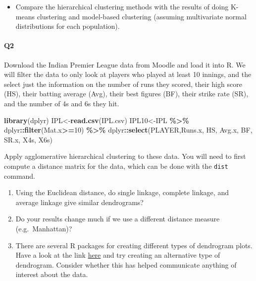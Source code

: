 \documentclass[
]{book}
\newenvironment{Shaded}{\begin{snugshade}}{\end{snugshade}}
\newcommand{\DecValTok}[1]{\textcolor[rgb]{0.00,0.00,0.81}{#1}}
\newcommand{\FunctionTok}[1]{\textcolor[rgb]{0.13,0.29,0.53}{\textbf{#1}}}
\newcommand{\NormalTok}[1]{#1}
\newcommand{\OtherTok}[1]{\textcolor[rgb]{0.56,0.35,0.01}{#1}}
\newcommand{\SpecialCharTok}[1]{\textcolor[rgb]{0.81,0.36,0.00}{\textbf{#1}}}
\newcommand{\StringTok}[1]{\textcolor[rgb]{0.31,0.60,0.02}{#1}}
\providecommand{\tightlist}{%
  \setlength{\itemsep}{0pt}\setlength{\parskip}{0pt}}
\theoremstyle{definition}
\theoremstyle{definition}
\theoremstyle{definition}
\theoremstyle{definition}
\theoremstyle{remark}
\begin{document}
\begin{itemize}
\tightlist
\item
  Compare the hierarchical clustering methods with the results of doing K-means clustering and model-based clustering (assuming multivariate normal distributions for each population).
\end{itemize}

\hypertarget{q2}{%
\paragraph*{Q2}\label{q2}}

Download the Indian Premier League data from Moodle and load it into R. We will filter the data to only look at players who played at least 10 innings, and the select just the information on the number of runs they scored, their high score (HS), their batting average (Avg), their best figures (BF), their strike rate (SR), and the number of 4s and 6s they hit.

\begin{Shaded}
\begin{Highlighting}[]
\FunctionTok{library}\NormalTok{(dplyr)}
\NormalTok{IPL}\OtherTok{\textless{}{-}}\FunctionTok{read.csv}\NormalTok{(}\StringTok{\textquotesingle{}IPL.csv\textquotesingle{}}\NormalTok{)}
\NormalTok{IPL10}\OtherTok{\textless{}{-}}\NormalTok{IPL }\SpecialCharTok{\%\textgreater{}\%}\NormalTok{ dplyr}\SpecialCharTok{::}\FunctionTok{filter}\NormalTok{(Mat.x}\SpecialCharTok{\textgreater{}=}\DecValTok{10}\NormalTok{) }\SpecialCharTok{\%\textgreater{}\%}
\NormalTok{  dplyr}\SpecialCharTok{::}\FunctionTok{select}\NormalTok{(PLAYER,Runs.x, HS, Avg.x, BF, SR.x, X4s, X6s)}
\end{Highlighting}
\end{Shaded}

Apply agglomerative hierarchical clustering to these data. You will need to first compute a distance matrix for the data, which can be done with the \texttt{dist} command.

\begin{enumerate}
\def\labelenumi{\roman{enumi}.}
\item
  Using the Euclidean distance, do single linkage, complete linkage, and average linkage give similar dendrograms?
\item
  Do your results change much if we use a different distance measure (e.g.~Manhattan)?
\item
  There are several R packages for creating different types of dendrogram plots. Have a look at the link \href{http://www.sthda.com/english/wiki/beautiful-dendrogram-visualizations-in-r-5-must-known-methods-unsupervised-machine-learning}{here} and try creating an alternative type of dendrogram. Consider whether this has helped communicate anything of interest about the data.
\end{enumerate}
\end{document}
